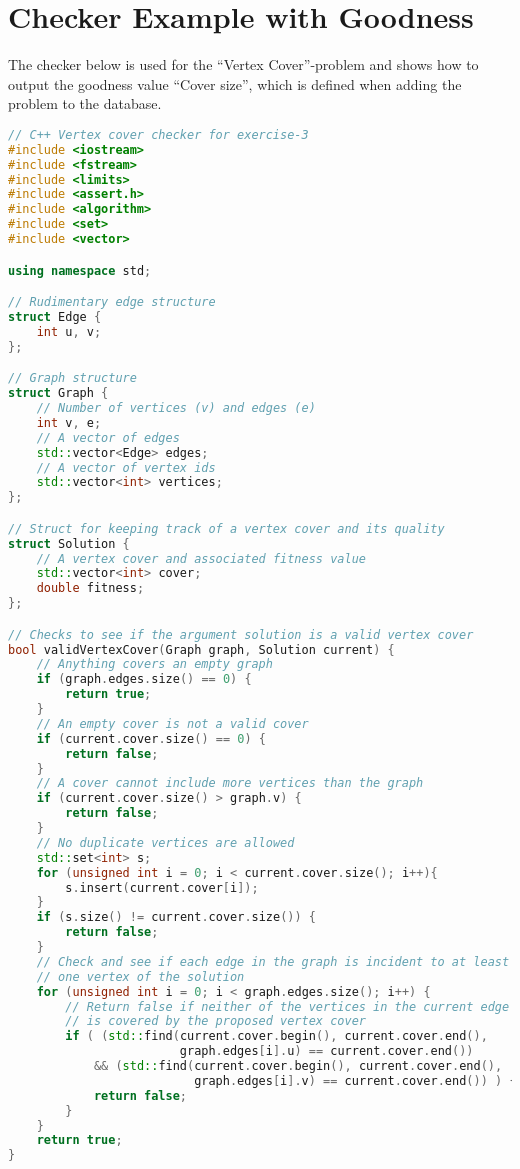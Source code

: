 \section{Checker Example with Goodness}
\label{sec:checker-advanced}
The checker below is used for the ``Vertex Cover''-problem and shows how to output the goodness value ``Cover size'', which is defined when adding the problem to the database.
\begin{lstlisting}[language=c++]
// C++ Vertex cover checker for exercise-3
#include <iostream>
#include <fstream>
#include <limits>
#include <assert.h>
#include <algorithm>
#include <set>
#include <vector>

using namespace std;

// Rudimentary edge structure
struct Edge {
    int u, v;
};

// Graph structure
struct Graph {
    // Number of vertices (v) and edges (e)
    int v, e;
    // A vector of edges
    std::vector<Edge> edges;
    // A vector of vertex ids
    std::vector<int> vertices;
};

// Struct for keeping track of a vertex cover and its quality
struct Solution {
    // A vertex cover and associated fitness value
    std::vector<int> cover;
    double fitness;
};

// Checks to see if the argument solution is a valid vertex cover
bool validVertexCover(Graph graph, Solution current) {
    // Anything covers an empty graph
    if (graph.edges.size() == 0) {
        return true;
    }
    // An empty cover is not a valid cover
    if (current.cover.size() == 0) {
        return false;
    }
    // A cover cannot include more vertices than the graph
    if (current.cover.size() > graph.v) {
        return false;
    }
    // No duplicate vertices are allowed
    std::set<int> s;
    for (unsigned int i = 0; i < current.cover.size(); i++){
        s.insert(current.cover[i]);
    }
    if (s.size() != current.cover.size()) {
        return false;
    }
    // Check and see if each edge in the graph is incident to at least
    // one vertex of the solution
    for (unsigned int i = 0; i < graph.edges.size(); i++) {
        // Return false if neither of the vertices in the current edge
        // is covered by the proposed vertex cover
        if ( (std::find(current.cover.begin(), current.cover.end(),
                        graph.edges[i].u) == current.cover.end())
            && (std::find(current.cover.begin(), current.cover.end(),
                          graph.edges[i].v) == current.cover.end()) ) {
            return false;
        }
    }
    return true;
}


\end{lstlisting}
